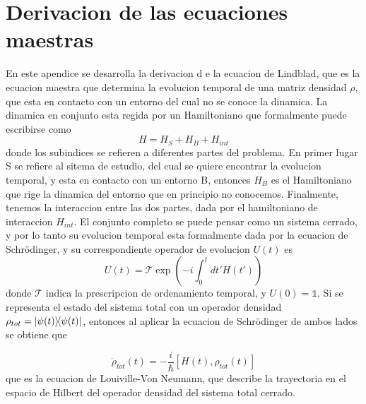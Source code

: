 \chapter{Derivacion de las ecuaciones maestras}
\label{ap_ecsmaestras}

\pagestyle{fancy}
\fancyhf{}
\fancyhead[LE]{\nouppercase{\rightmark\hfill}}
\fancyhead[RO]{\nouppercase{\leftmark\hfill}}
\fancyfoot[LE,RO]{\hfill\thepage\hfill}

En este apendice se desarrolla la derivacion d
e la ecuacion de Lindblad, que es la ecuacion maestra que determina la evolucion temporal de una matriz densidad $\rho$, que esta en contacto con un entorno del cual no se conoce la dinamica. La dinamica en conjunto esta regida por un Hamiltoniano que formalmente puede escribirse como
\begin{equation}
    H=H_S+H_B+H_{int}
\end{equation}
donde los subindices se refieren a diferentes partes del problema. En primer lugar S se refiere al sitema de estudio, del cual se quiere encontrar la evolucion temporal, y esta en contacto con un entorno B, entonces $H_B$ es el Hamiltoniano que rige la dinamica del entorno que en principio no conocemos. Finalmente, tenemos la interaccion entre las dos partes, dada por el hamiltoniano de interaccion $H_{int}$.
El conjunto completo se puede pensar como un sistema cerrado, y por lo tanto su evolucion temporal esta formalmente dada por la ecuacion de Schrödinger, y su correspondiente operador de evolucion $U(t)$ es
\begin{equation}
    U(t)=\mathcal{T}\exp\left( -i\int_{0}^{t}dt'H(t') \right)
\end{equation}
donde $\mathcal{T}$ indica la prescripcion de ordenamiento temporal, y $U(0)=\mathbb{1}$. Si se representa el estado del sistema total con un operador densidad $\rho_{tot}=\ketbra{\psi(t)}{\psi(t)}$, entonces al aplicar la ecuacion de Schrödinger de ambos lados se obtiene que 

\begin{equation}
    \dot\rho_{tot}(t)=-\frac{i}{\hbar}[H(t),\rho_{tot}(t)]
\end{equation}
que es la ecuacion de Louiville-Von Neumann, que describe la trayectoria en el espacio de Hilbert del operador densidad del sistema total cerrado.

